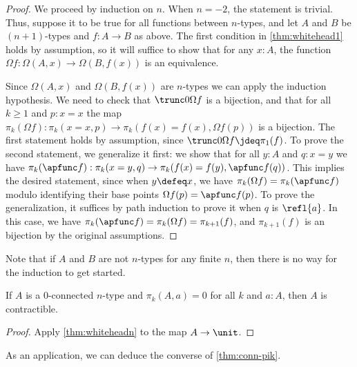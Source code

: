 {\begin{proof}
  We proceed by induction on $n$.
  When $n=-2$, the statement is trivial.
  Thus, suppose it to be true for all functions between $n$-types, and let $A$ and $B$ be $(n+1)$-types and $f:A\to B$ as above.
  The first condition in \cref{thm:whitehead1} holds by assumption, so it will suffice to show that for any $x:A$, the function $\Omega f: \Omega(A,x) \to \Omega(B,f(x))$ is an equivalence.

  Since $\Omega(A,x)$ and $\Omega(B,f(x))$ are $n$-types we can apply the induction hypothesis.
  We need to check that $\trunc 0{\Omega f}$ is a bijection, and that for all $k\geq1$ and $p : x = x$ the map $\pi_k(\Omega f):\pi_k(x = x,p) \to \pi_k(f(x) = f(x),\Omega f(p))$ is a bijection.
  The first statement holds by assumption, since $\trunc 0{\Omega f} \jdeq \pi_1(f)$.
  To prove the second statement, we generalize it first: we show that for all $y : A$ and $q : x = y$ we have $\pi_k(\apfunc f):\pi_k(x = y,q) \to \pi_k(f(x) = f(y),\apfunc f(q))$.
  This implies the desired statement, since when $y\defeq x$, we have $\pi_k(\Omega f)=\pi_k(\apfunc f)$ modulo identifying their base points $\Omega f(p)=\apfunc f(p)$.
  To prove the generalization, it suffices by path induction to prove it when $q$ is $\refl{a}$.
  In this case, we have $\pi_k(\apfunc f) = \pi_k(\Omega f) = \pi_{k+1}(f)$, and $\pi_{k+1}(f)$ is an bijection by the original assumptions.
\end{proof}

Note that if $A$ and $B$ are not $n$-types for any finite $n$, then there is no way for the induction to get started.

\begin{cor}\label{thm:whitehead-contr}
  If $A$ is a $0$-connected $n$-type and $\pi_k(A,a)=0$ for all $k$ and $a:A$, then $A$ is contractible.
\end{cor}
\begin{proof}
  Apply \cref{thm:whiteheadn} to the map $A\to\unit$.
\end{proof}

As an application, we can deduce the converse of \cref{thm:conn-pik}.

}
